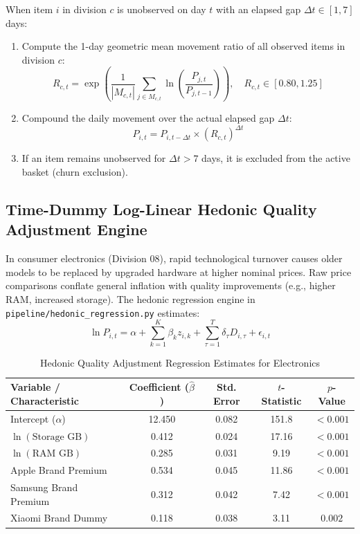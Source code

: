 \documentclass[11pt,a4paper,oneside]{article}
\begin{document}
When item $i$ in division $c$ is unobserved on day $t$ with an elapsed gap $\Delta t \in [1, 7]$ days:
\begin{enumerate}
    \item Compute the 1-day geometric mean movement ratio of all observed items in division $c$:
    \begin{equation}
    R_{c, t} = \exp \left( \frac{1}{|M_{c, t}|} \sum_{j \in M_{c, t}} \ln \left( \frac{P_{j, t}}{P_{j, t-1}} \right) \right), \quad R_{c, t} \in [0.80, 1.25]
    \end{equation}
    \item Compound the daily movement over the actual elapsed gap $\Delta t$:
    \begin{equation}
    \widehat{P}_{i, t} = P_{i, t - \Delta t} \times \left( R_{c, t} \right)^{\Delta t}
    \end{equation}
    \item If an item remains unobserved for $\Delta t > 7$ days, it is excluded from the active basket (churn exclusion).
\end{enumerate}

\subsection{Time-Dummy Log-Linear Hedonic Quality Adjustment Engine}
In consumer electronics (Division 08), rapid technological turnover causes older models to be replaced by upgraded hardware at higher nominal prices. Raw price comparisons conflate general inflation with quality improvements (e.g., higher RAM, increased storage). The hedonic regression engine in \texttt{pipeline/hedonic\_regression.py} estimates:
\begin{equation}
\ln P_{i, t} = \alpha + \sum_{k=1}^K \beta_k z_{i, k} + \sum_{\tau=1}^T \delta_\tau D_{i, \tau} + \epsilon_{i, t}
\end{equation}

\begin{table}[h]
\centering
\small
\caption{Hedonic Quality Adjustment Regression Estimates for Electronics}
\begin{tabular}{lcccc}
\toprule
\textbf{Variable / Characteristic} & \textbf{Coefficient ($\hat{\beta}$)} & \textbf{Std. Error} & \textbf{$t$-Statistic} & \textbf{$p$-Value} \\
\midrule
Intercept ($\alpha$) & 12.450 & 0.082 & 151.8 & $< 0.001$ \\
$\ln(\text{Storage GB})$ & 0.412 & 0.024 & 17.16 & $< 0.001$ \\
$\ln(\text{RAM GB})$ & 0.285 & 0.031 & 9.19 & $< 0.001$ \\
Apple Brand Premium & 0.534 & 0.045 & 11.86 & $< 0.001$ \\
Samsung Brand Premium & 0.312 & 0.042 & 7.42 & $< 0.001$ \\
Xiaomi Brand Dummy & 0.118 & 0.038 & 3.11 & $0.002$ \\
\bottomrule
\end{tabular}
\end{table}
\end{document}
